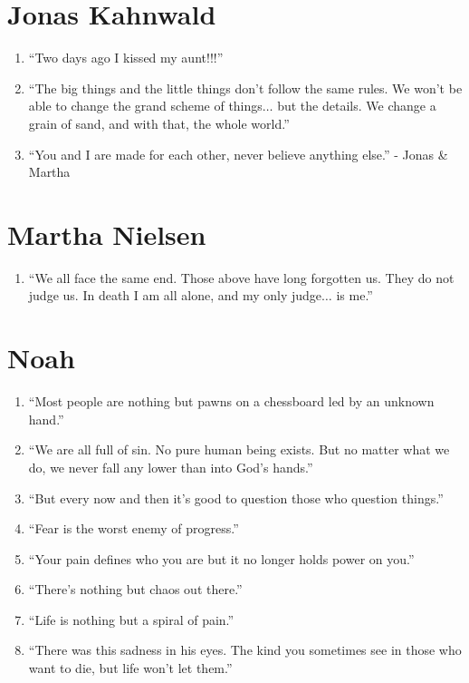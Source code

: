 \documentclass{book}
\numberwithin{equation}{section}
\begin{document}
\section{Jonas Kahnwald}
\begin{enumerate}
    \item ``Two days ago I kissed my aunt!!!''
    \item ``The big things and the little things don't follow the same rules. We won't be able to change the grand scheme of things$\ldots$ but the details. We change a grain of sand, and with that, the whole world.''
    \item ``You and I are made for each other, never believe anything else.'' - Jonas \& Martha
\end{enumerate}

\section{Martha Nielsen}
\begin{enumerate}
    \item ``We all face the same end. Those above have long forgotten us. They do not judge us. In death I am all alone, and my only judge$\ldots$ is me.''
\end{enumerate}

\section{Noah}
\begin{enumerate}
    \item ``Most people are nothing but pawns on a chessboard led by an unknown hand.''
    \item ``We are all full of sin. No pure human being exists. But no matter what we do, we never fall any lower than into God's hands.''
    \item ``But every now and then it's good to question those who question things.''
    \item ``Fear is the worst enemy of progress.''
    \item ``Your pain defines who you are but it no longer holds power on you.''
    \item ``There's nothing but chaos out there.''
    \item ``Life is nothing but a spiral of pain.''
    \item ``There was this sadness in his eyes. The kind you sometimes see in those who want to die, but life won't let them.''
\end{enumerate}
\end{document}
